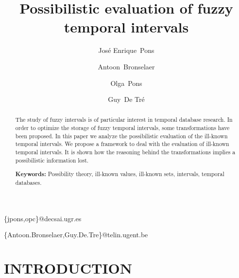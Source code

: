 \documentclass[twoside,twocolumn,a4paper]{article}
\begin{document}
\title{Possibilistic evaluation of fuzzy temporal intervals}


\author[1]{Jos\'e Enrique~Pons}
\author[2]{Antoon~Bronselaer}
\author[1]{Olga~Pons}
\author[2]{Guy~De Tr\'e}
\address[1]{Department of Computer Science and Artificial Intelligence,University of Granada, Spain}{\{jpons,opc\}@decsai.ugr.es}
\address[2]{Department of Telecommunications and Information Processing, Ghent University, Belgium}{\{Antoon.Bronselaer,Guy.De.Tre\}@telin.ugent.be}

\maketitle

\begin{abstract}
The study of fuzzy intervals is of particular interest in temporal database research. In order to optimize the storage of fuzzy temporal intervals, some transformations have been proposed. In this paper we analyze the possibilistic evaluation of the ill-known temporal intervals. We propose a framework to deal with the evaluation of ill-known temporal intervals. It is shown how the reasoning behind the transformations implies a possibilistic information lost. 

\textbf{Keywords:} Possibility theory, ill-known values, ill-known sets, intervals, temporal databases.\vspace{9mm}
\end{abstract}

\section{INTRODUCTION}
\end{document}
